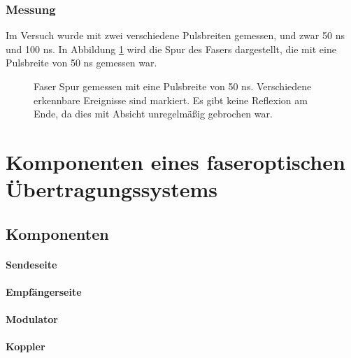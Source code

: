 \documentclass[a4paper]{article}
\begin{document}
\subsubsection{Messung}
Im Versuch wurde mit zwei verschiedene Pulsbreiten gemessen, und zwar 50 ns und
100 ns. In Abbildung \ref{fig:pw50} wird die Spur des Fasers dargestellt, die
mit eine Pulsbreite von 50 ns gemessen war. 
\begin{figure}[H]
  \centering
  \caption{Faser Spur gemessen mit eine Pulsbreite von 50 ns. Verschiedene
  erkennbare Ereignisse sind markiert. Es gibt keine Reflexion am Ende, da 
  dies mit Absicht unregelmäßig gebrochen war.}
  \label{fig:pw50}
\end{figure}



\newpage
\section{Komponenten eines faseroptischen Übertragungssystems}
\subsection{Komponenten}
\paragraph{Sendeseite}
\paragraph{Empfängerseite}
\paragraph{Modulator}
\paragraph{Koppler}
\end{document}
